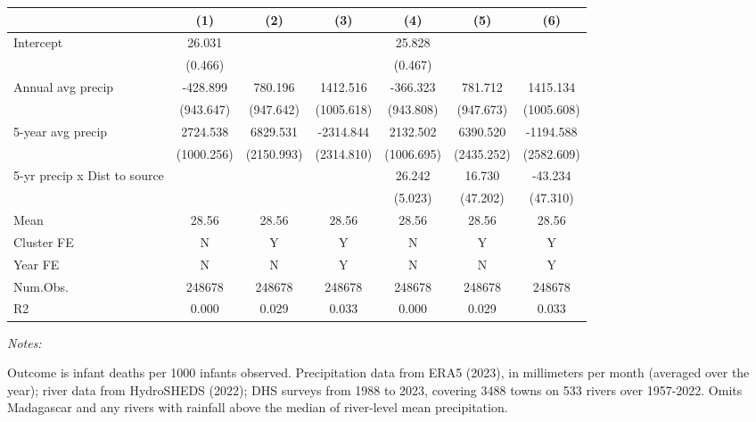 \begin{table}[H]
\centering
\begin{threeparttable}
\begin{tabular}[t]{lcccccc}
\toprule
  & (1) & (2) & (3) & (4) & (5) & (6)\\
\midrule
Intercept & 26.031 &  &  & 25.828 &  & \\
 & (0.466) &  &  & (0.467) &  & \\
Annual avg precip & -428.899 & 780.196 & 1412.516 & -366.323 & 781.712 & 1415.134\\
 & (943.647) & (947.642) & (1005.618) & (943.808) & (947.673) & (1005.608)\\
5-year avg precip & 2724.538 & 6829.531 & -2314.844 & 2132.502 & 6390.520 & -1194.588\\
 & (1000.256) & (2150.993) & (2314.810) & (1006.695) & (2435.252) & (2582.609)\\
5-yr precip x Dist to source &  &  &  & 26.242 & 16.730 & -43.234\\
 &  &  &  & (5.023) & (47.202) & (47.310)\\
\midrule
Mean & 28.56 & 28.56 & 28.56 & 28.56 & 28.56 & 28.56\\
Cluster FE & N & Y & Y & N & Y & Y\\
Year FE & N & N & Y & N & N & Y\\
Num.Obs. & 248678 & 248678 & 248678 & 248678 & 248678 & 248678\\
R2 & 0.000 & 0.029 & 0.033 & 0.000 & 0.029 & 0.033\\
\bottomrule
\end{tabular}
\begin{tablenotes}
\item \textit{Notes: } 
\item Outcome is infant deaths per 1000 infants observed. Precipitation data from ERA5 (2023), in millimeters per month (averaged over the year); river data from HydroSHEDS (2022); DHS surveys from 1988 to 2023, covering 3488 towns on 533 rivers over 1957-2022. Omits Madagascar and any rivers with rainfall above the median of river-level mean precipitation.
\end{tablenotes}
\end{threeparttable}
\end{table}
